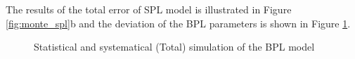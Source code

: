 The results of the total error of SPL model is illustrated in
Figure \ref{fig:monte_spl}b and the deviation of the BPL parameters
is shown in Figure \ref{fig:monte_bpl_tot}.

\begin{figure}[h!]
    \centering
        \caption{Statistical and systematical (Total) simulation of the BPL model}
       \label{fig:monte_bpl_tot}
\end{figure}